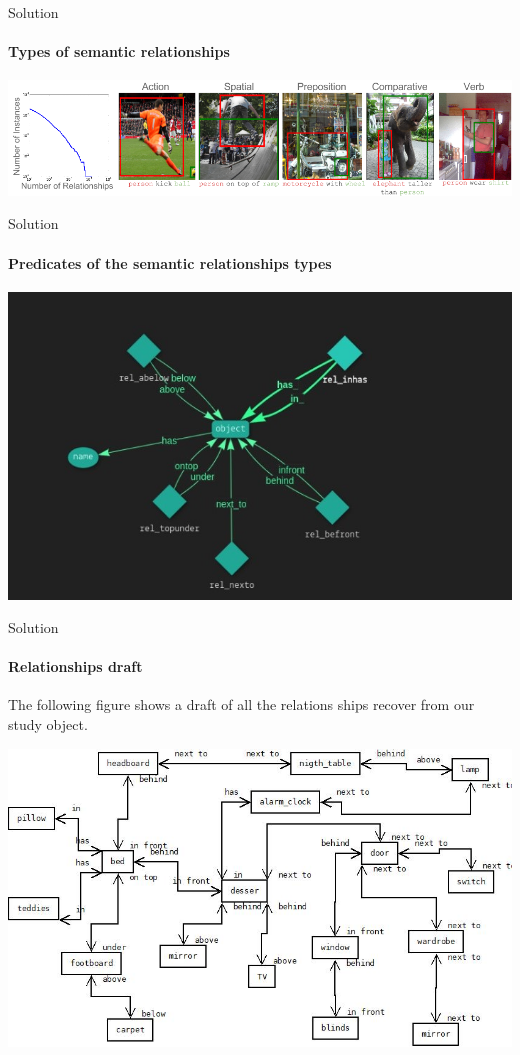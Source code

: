\documentclass[aspectratio=169]{beamer}
\begin{document}
\begin{darkframes}
    \begin{frame}{Solution}
      \framesubtitle{\alert{Types of semantic relationships}}%
      \begin{center}
        \includegraphics[width=\linewidth]{predica}
      \end{center}
    \end{frame}       

    \begin{frame}{Solution}
      \framesubtitle{\alert{Predicates of the semantic relationships types}}%
      \begin{center}
        \includegraphics[width=0.8\linewidth]{dObje}
      \end{center}
    \end{frame}       
   
    \begin{frame}{Solution}
      \framesubtitle{\alert{Relationships draft}}%
      The following figure shows a draft of all the relations ships
      recover from our study object.
      \begin{center}
        \includegraphics[width=0.7\linewidth]{grafo}
      \end{center}
    \end{frame}  


\end{darkframes}
\end{document}
